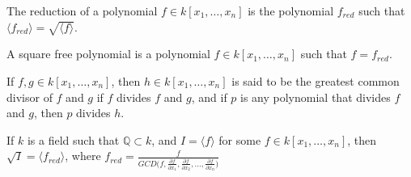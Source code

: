 \documentclass[crop=false,class=article,oneside]{standalone}
\begin{document}
    \begin{definition}
    The reduction of a polynomial $f\in k[x_1,\hdots ,x_n]$ is the polynomial $f_{red}$ such that $\langle f_{red}\rangle = \sqrt{\langle f\rangle}$.
    \end{definition}
    \begin{definition}
    A square free polynomial is a polynomial $f\in k[x_1,\hdots ,x_n]$ such that $f = f_{red}$.
    \end{definition}
    \begin{definition}
    If $f,g\in k[x_1,\hdots ,x_n]$, then $h\in k[x_1,\hdots ,x_n]$ is said to be the greatest common divisor of $f$ and $g$ if $f$ divides $f$ and $g$, and if $p$ is any polynomial that divides $f$ and $g$, then $p$ divides $h$.
    \end{definition}
    \begin{theorem}
    If $k$ is a field such that $\mathbb{Q} \subset k$, and $I = \langle f\rangle$ for some $f\in k[x_1,\hdots ,x_n]$, then $\sqrt{I} = \langle f_{red}\rangle$, where $f_{red} = \frac{f}{GCD\big(f, \frac{\partial f}{\partial x_1}, \frac{\partial f}{\partial x_2}, \hdots, \frac{\partial f}{\partial x_n}\big)}$
    \end{theorem}
\end{document}
